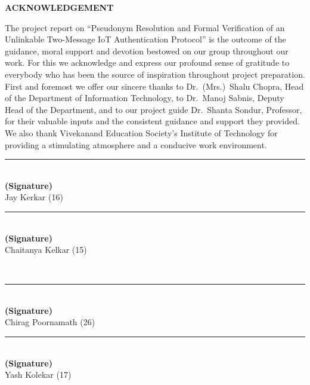 \documentclass[12pt,a4paper,oneside]{report}
\numberwithin{equation}{chapter}
\newcommand{\ProjectTitle}{Pseudonym Resolution and Formal Verification of an Unlinkable Two-Message IoT Authentication Protocol}
\newcommand{\prelimtitle}[2][\itshape]{%
  \begin{center}{\georgia\bfseries#1\fontsize{16}{20}\selectfont #2\par}\end{center}\vspace{18pt}}
\newcommand{\sigblock}[1]{%
  \begin{minipage}[t]{0.46\textwidth}\centering
  \rule{1.4in}{0.4pt}\\[-2pt]{\bfseries (Signature)}\\#1\end{minipage}}
\newcommand{\StudentA}{Jay Kerkar}
\newcommand{\StudentB}{Chaitanya Kelkar}
\newcommand{\StudentC}{Chirag Poornamath}
\newcommand{\StudentD}{Yash Kolekar}
\newcommand{\RollA}{16}
\newcommand{\RollB}{15}
\newcommand{\RollC}{26}
\newcommand{\RollD}{17}
\newcommand{\GuideName}{Dr.\ Shanta Sondur}
\begin{document}
\tableofcontents
\clearpage
\listoffigures
\clearpage
\listoftables
\clearpage

\prelimtitle[\upshape]{ACKNOWLEDGEMENT}
The project report on ``\ProjectTitle'' is the outcome of the guidance, moral support and devotion bestowed on our group throughout our work. For this we acknowledge and express our profound sense of gratitude to everybody who has been the source of inspiration throughout project preparation. First and foremost we offer our sincere thanks to Dr.\ (Mrs.)\ Shalu Chopra, Head of the Department of Information Technology, to Dr.\ Manoj Sabnis, Deputy Head of the Department, and to our project guide \GuideName, Professor, for their valuable inputs and the consistent guidance and support they provided. We also thank Vivekanand Education Society's Institute of Technology for providing a stimulating atmosphere and a conducive work environment.

\vspace{0.8in}
\noindent\sigblock{\StudentA{} (\RollA)}\hfill\sigblock{\StudentB{} (\RollB)}\\[0.7in]
\noindent\sigblock{\StudentC{} (\RollC)}\hfill\sigblock{\StudentD{} (\RollD)}

\clearpage
{}
\setcounter{page}{1}






\end{document}
